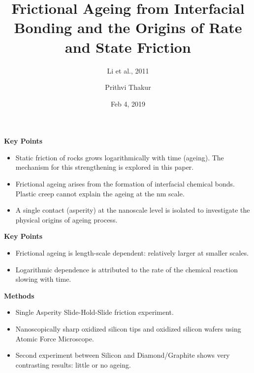 \documentclass[11pt]{beamer}
\title{\textbf{Frictional Ageing from Interfacial Bonding and the Origins of Rate and State Friction}}
\date{Feb 4, 2019}
\author{Prithvi Thakur}
\subtitle{Li et al., 2011}
\begin{document}
\maketitle

\linespread{1.3}

\begin{frame}{\textbf{Key Points}}
    \begin{itemize}
        \item Static friction of rocks grows logarithmically with time (ageing). The mechanism for this strengthening is explored in this paper.
        \item Frictional ageing arises from the formation of interfacial chemical bonds. Plastic creep cannot explain the ageing at the nm scale.
        \item A single contact (asperity) at the nanoscale level is isolated to investigate the physical origins of ageing process.
    \end{itemize}
\end{frame}
\begin{frame}{\textbf{Key Points}}
    \begin{itemize}
        \item Frictional ageing is length-scale dependent: relatively larger at smaller scales.
        \item Logarithmic dependence is attributed to the rate of the chemical reaction slowing with time.
    \end{itemize}
\end{frame}

\begin{frame}{\textbf{Methods}}
    \begin{itemize}
        \item Single Asperity Slide-Hold-Slide friction experiment.
        \item Nanoscopically sharp oxidized silicon tips and oxidized silicon wafers using Atomic Force Microscope.
        \item Second experiment between Silicon and Diamond/Graphite shows very contrasting results: little or no ageing.
    \end{itemize}
\end{frame}
\end{document}
